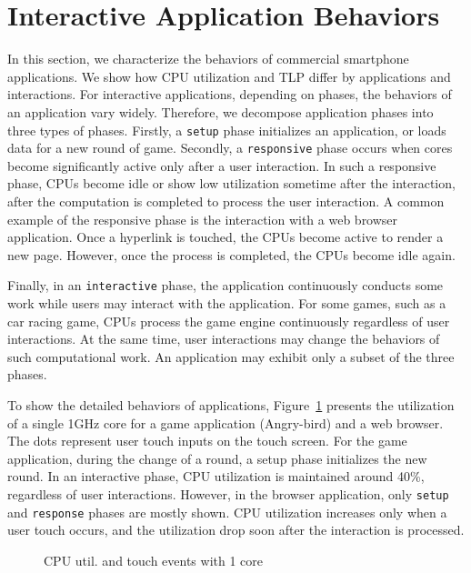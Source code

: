 \section{Interactive Application Behaviors}

In this section, we characterize the behaviors of commercial smartphone applications. 
We show how CPU utilization and TLP differ by applications and interactions.
For interactive applications, depending on phases, the behaviors of an application vary 
widely. Therefore, we decompose application phases into three types of phases. Firstly, a {\tt setup}
phase initializes an application, or loads data for a new round of game. Secondly,
a {\tt responsive} phase occurs when cores become significantly active only after a user interaction.
In such a responsive phase, CPUs become idle or show low utilization sometime after the interaction, after
the computation is completed to process the user interaction. A common example of
the responsive phase is the interaction with a web browser application. Once
a hyperlink is touched, the CPUs become active to render a new page. However,
once the process is completed, the CPUs become idle again.

Finally, in an {\tt interactive} phase, the application continuously conducts some work
while users may interact with the application. For some games, such as a car racing game,
CPUs process the game engine continuously regardless of user interactions. At the same time,
user interactions may change the behaviors of such computational work.
An application may exhibit only a subset of the three phases. 

To show the detailed behaviors of applications, Figure~\ref{fig:interact_util_1cpu} presents
the utilization of a single 1GHz core for a game application (Angry-bird) and a web browser.
The dots represent user touch inputs on the touch screen.
For the game application, during
the change of a round, a setup phase initializes the new round. In an interactive phase,
CPU utilization is maintained around 40\%, regardless of user interactions. 
However, in the browser application, only {\tt setup} and {\tt response} phases are mostly
shown. CPU utilization increases only when a user touch occurs, and the utilization
drop soon after the interaction is processed.

\begin{figure}[bt]
\begin{center}
\end{center}
\caption{CPU util. and touch events with 1 core}
\label{fig:interact_util_1cpu} 
\end{figure}


